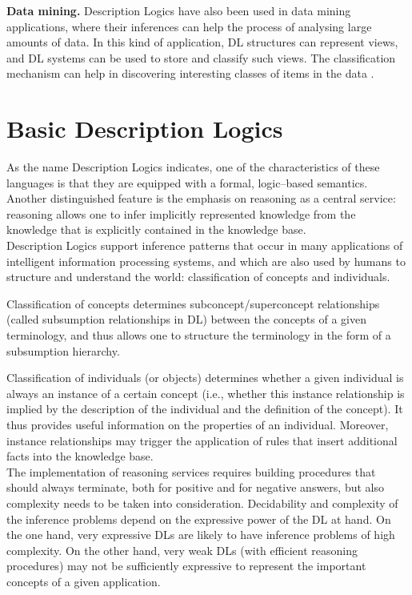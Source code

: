 \documentclass[a4paper, 11pt, oneside]{duthesis}
\begin{document}
\textbf{Data mining.} Description Logics have also been used in data mining applications, where their inferences can help the process of analysing large amounts of data.
In this kind of application, DL structures can represent views, and DL systems can be used to store and classify such views. The classification mechanism can help in discovering interesting classes of items in the data
\cite{Nardi:2003:IDL:885746.885748}.

\newpage

\section{Basic Description Logics}
As the name Description Logics indicates, one of the characteristics of these languages is that they are equipped with a formal, logic--based semantics.
Another distinguished feature is the emphasis on reasoning as a central service: reasoning allows one to infer implicitly represented knowledge from the knowledge that is explicitly contained in the knowledge base.\\

Description Logics support inference patterns that occur in many applications of intelligent information processing systems, and which are also used by humans to structure and understand the world: classification of concepts and individuals.

Classification of concepts determines subconcept/superconcept relationships (called subsumption relationships in DL) between the concepts of a given terminology, and thus allows one to structure the terminology in the form of a subsumption hierarchy.

Classification of individuals (or objects) determines whether a given individual is always an instance of a certain concept (i.e., whether this instance relationship is implied by the description of the individual and the definition of the concept). It thus provides useful information on the properties of an individual.
Moreover, instance relationships may trigger the application of rules that insert additional facts into the knowledge base.\\

The implementation of reasoning services requires building procedures that should always terminate, both for positive and for negative answers, but also complexity needs to be taken into consideration.
Decidability and complexity of the inference problems depend on the expressive power of the DL at hand.
On the one hand, very expressive DLs are likely to have inference problems of high complexity.
On the other hand, very weak DLs (with efficient reasoning procedures) may not be sufficiently expressive to represent the important concepts of a given application.
\end{document}
